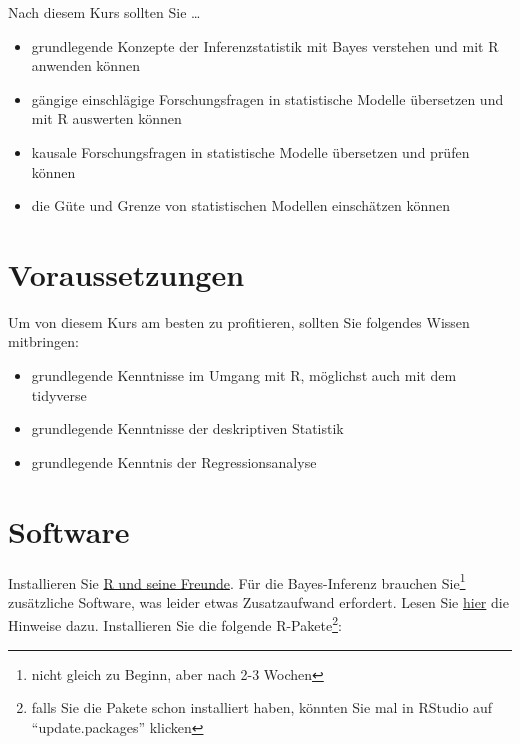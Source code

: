 \documentclass[
  a4paper,
  DIV=11]{scrreprt}
\providecommand{\tightlist}{%
  \setlength{\itemsep}{0pt}\setlength{\parskip}{0pt}}\usepackage{longtable,booktabs,array}
\theoremstyle{definition}
\theoremstyle{remark}
\begin{document}
Nach diesem Kurs sollten Sie \ldots{}

\begin{itemize}
\tightlist
\item
  grundlegende Konzepte der Inferenzstatistik mit Bayes verstehen und
  mit R anwenden können
\item
  gängige einschlägige Forschungsfragen in statistische Modelle
  übersetzen und mit R auswerten können
\item
  kausale Forschungsfragen in statistische Modelle übersetzen und prüfen
  können
\item
  die Güte und Grenze von statistischen Modellen einschätzen können
\end{itemize}

\hypertarget{voraussetzungen}{%
\section*{Voraussetzungen}\label{voraussetzungen}}


Um von diesem Kurs am besten zu profitieren, sollten Sie folgendes
Wissen mitbringen:

\begin{itemize}
\tightlist
\item
  grundlegende Kenntnisse im Umgang mit R, möglichst auch mit dem
  tidyverse
\item
  grundlegende Kenntnisse der deskriptiven Statistik
\item
  grundlegende Kenntnis der Regressionsanalyse
\end{itemize}

\hypertarget{software}{%
\section*{Software}\label{software}}


Installieren Sie
\href{https://data-se.netlify.app/2021/11/30/installation-von-r-und-seiner-freunde/}{R
und seine Freunde}. Für die Bayes-Inferenz brauchen Sie\footnote{nicht
  gleich zu Beginn, aber nach 2-3 Wochen} zusätzliche Software, was
leider etwas Zusatzaufwand erfordert. Lesen Sie
\href{https://data-se.netlify.app/2022/01/28/bayes-software-installieren-f\%C3\%BCr-r/}{hier}
die Hinweise dazu. Installieren Sie die folgende R-Pakete\footnote{falls
  Sie die Pakete schon installiert haben, könnten Sie mal in RStudio auf
  ``update.packages'' klicken}:
\end{document}
